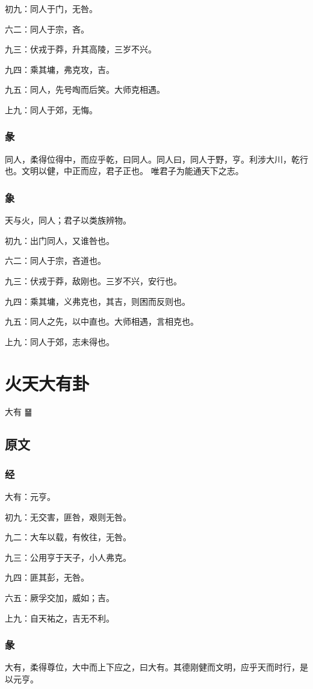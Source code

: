 \documentclass[12pt,oneside]{book}
\begin{document}
初九：同人于门，无咎。

六二：同人于宗，吝。

九三：伏戎于莽，升其高陵，三岁不兴。

九四：乘其墉，弗克攻，吉。

九五：同人，先号啕而后笑。大师克相遇。

上九：同人于郊，无悔。

\subsection{彖}
同人，柔得位得中，而应乎乾，曰同人。同人曰，同人于野，亨。利涉大川，乾行也。文明以健，中正而应，君子正也。 唯君子为能通天下之志。

\subsection{象}
天与火，同人；君子以类族辨物。

初九：出门同人，又谁咎也。

六二：同人于宗，吝道也。

九三：伏戎于莽，敌刚也。三岁不兴，安行也。

九四：乘其墉，义弗克也，其吉，则困而反则也。

九五：同人之先，以中直也。大师相遇，言相克也。

上九：同人于郊，志未得也。


\chapter{火天大有卦}
大有 {\Large ䷍}

\section{原文}

\subsection{经}
大有：元亨。

初九：无交害，匪咎，艰则无咎。

九二：大车以载，有攸往，无咎。

九三：公用亨于天子，小人弗克。

九四：匪其彭，无咎。

六五：厥孚交加，威如；吉。

上九：自天祐之，吉无不利。

\subsection{彖}
大有，柔得尊位，大中而上下应之，曰大有。其德刚健而文明，应乎天而时行，是以元亨。
\end{document}
